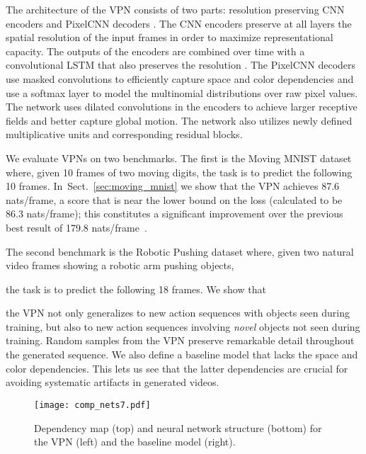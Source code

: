 \documentclass{article}
\newcommand{\sref}[1]{Sect.~\ref{#1}}
\begin{document}
The architecture of the VPN consists of two parts: resolution preserving CNN encoders and PixelCNN decoders \citep{van2016pixel}. The CNN encoders preserve at all layers the spatial resolution of the input frames in order to maximize representational capacity. The outputs of the encoders are combined over time with a convolutional LSTM that also preserves the resolution \citep{hochreiter1997long,DBLP:conf/nips/ShiCWYWW15}. The PixelCNN decoders use masked convolutions to efficiently capture space and color dependencies and use a softmax layer to model the multinomial distributions over raw pixel values. The network uses dilated convolutions in the encoders to achieve larger receptive fields and better capture global motion. The network also utilizes newly defined multiplicative units and corresponding residual blocks.


We evaluate VPNs on two benchmarks. The first is the Moving MNIST dataset \citep{ICML-2015-SrivastavaMS} where, given 10 frames of two moving digits, the task is to predict the following 10 frames. In~\sref{sec:moving_mnist} we show that the VPN achieves 87.6 nats/frame, a score that is near the lower bound on the loss (calculated to be 86.3 nats/frame); this constitutes a significant improvement over the previous best result of 179.8 nats/frame~\citep{DBLP:journals/corr/PatrauceanHC15}.

The second benchmark is the Robotic Pushing dataset \citep{DBLP:journals/corr/FinnGL16} where, given two natural video frames showing a robotic arm pushing objects,

the task is to predict the following 18 frames. We show that 

the VPN not only generalizes to new action sequences with objects seen during training, but also to new action sequences involving \emph{novel} objects not seen during training. Random samples from the VPN preserve remarkable detail throughout the generated sequence. 
We also define a baseline model that lacks the space and color dependencies. This lets us see that the latter dependencies are crucial for avoiding systematic artifacts in generated videos. 

\begin{figure}
\vspace{-0.5cm}
\centering
\texttt{[image: comp\_nets7.pdf]}
\caption{
Dependency map (top) and neural network structure (bottom) for the VPN (left) and the baseline model (right).
}
\vspace{-0.5cm}
\label{fig:dependencies}
\end{figure}
\end{document}

